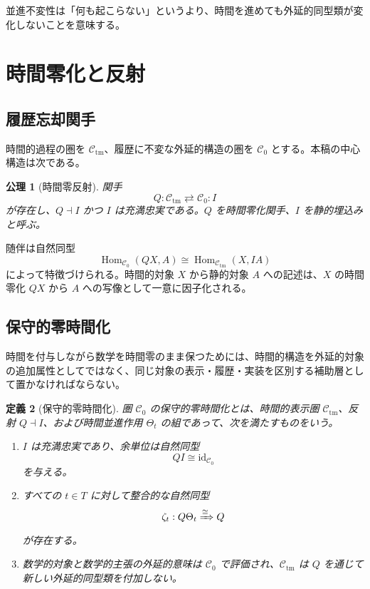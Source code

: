 \documentclass[a4paper,11pt]{ltjsarticle}
\newtheorem{definition}{定義}[section]
\newtheorem{axiom}[definition]{公理}
\theoremstyle{remark}
\newcommand{\C}{\mathcal C}
\newcommand{\Hom}{\operatorname{Hom}}
\newcommand{\id}{\mathrm{id}}
\begin{document}
並進不変性は「何も起こらない」というより、時間を進めても外延的同型類が変化しないことを意味する。

\section{時間零化と反射}

\subsection{履歴忘却関手}
時間的過程の圏を $\C_{\mathrm{tm}}$、履歴に不変な外延的構造の圏を $\C_0$ とする。本稿の中心構造は次である。

\begin{axiom}[時間零反射]
関手
\begin{equation}
 Q:\C_{\mathrm{tm}}\rightleftarrows\C_0:I
 \label{eq:reflection}
\end{equation}
が存在し、$Q\dashv I$ かつ $I$ は充満忠実である。$Q$ を\emph{時間零化関手}、$I$ を\emph{静的埋込み}と呼ぶ。
\end{axiom}

随伴は自然同型
\begin{equation}
 \Hom_{\C_0}(QX,A)
 \cong
 \Hom_{\C_{\mathrm{tm}}}(X,IA)
 \label{eq:zero-adjunction}
\end{equation}
によって特徴づけられる。時間的対象 $X$ から静的対象 $A$ への記述は、$X$ の時間零化 $QX$ から $A$ への写像として一意に因子化される。

\subsection{保守的零時間化}
時間を付与しながら数学を時間零のまま保つためには、時間的構造を外延的対象の追加属性としてではなく、同じ対象の表示・履歴・実装を区別する補助層として置かなければならない。

\begin{definition}[保守的零時間化]
圏 $\C_0$ の\emph{保守的零時間化}とは、時間的表示圏 $\C_{\mathrm{tm}}$、反射 $Q\dashv I$、および時間並進作用 $\Theta_t$ の組であって、次を満たすものをいう。
\begin{enumerate}
  \item $I$ は充満忠実であり、余単位は自然同型
  \begin{equation}
   QI\cong\id_{\C_0}
   \label{eq:conservative-counit}
  \end{equation}
  を与える。
  \item すべての $t\in T$ に対して整合的な自然同型
  \begin{equation}
   \zeta_t:Q\Theta_t\xRightarrow{\cong}Q
   \label{eq:zero-time-invariance}
  \end{equation}
  が存在する。
  \item 数学的対象と数学的主張の外延的意味は $\C_0$ で評価され、$\C_{\mathrm{tm}}$ は $Q$ を通じて新しい外延的同型類を付加しない。
\end{enumerate}
\end{definition}
\end{document}

